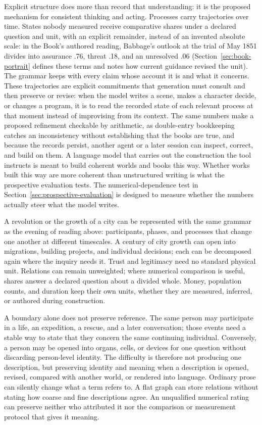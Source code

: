 \documentclass[11pt,a4paper]{article}
\begin{document}
Explicit structure does more than record that understanding: it is the proposed
mechanism for consistent thinking and acting. Processes carry trajectories over
time. States nobody measured receive comparative shares under a declared
question and unit, with an explicit remainder, instead of an invented absolute
scale: in the Book's authored reading, Babbage's outlook at the trial of May 1851
divides into assurance .76, threat .18, and an unresolved .06
(Section~\ref{sec:book-portrait} defines these terms and notes how current
guidance revised the unit). The grammar keeps with every claim whose account it
is and what it concerns. These
trajectories are explicit commitments that generation must consult and then
preserve or revise: when the model writes a scene, makes a character decide, or
changes a program, it is to read the recorded state of each relevant process at
that moment instead of improvising from its context. The same numbers make a
proposed refinement checkable by arithmetic, as double-entry bookkeeping catches
an inconsistency without establishing that the books are true, and because the
records persist, another agent or a later session can inspect, correct, and build
on them. A language model that carries out the construction the tool instructs is
meant to build coherent worlds and books this way. Whether works built
this way are more coherent than unstructured writing is what the prospective
evaluation tests. The numerical-dependence test in Section~\ref{sec:prospective-evaluation} is
designed to measure whether the numbers actually steer what the model writes.

A revolution or the growth of a city can be represented with the same grammar
as the evening of reading above: participants, phases, and processes that change one another
at different timescales. A century of city growth can open into migrations,
building projects, and individual decisions; each can be decomposed again where
the inquiry needs it. Trust and legitimacy need no standard physical unit.
Relations can remain unweighted; where numerical comparison is useful, shares
answer a declared question about a divided whole. Money, population counts, and
duration keep their own units, whether they are measured, inferred, or authored
during construction.

A boundary alone does not preserve reference. The same person may participate
in a life, an expedition, a rescue, and a later conversation; those events need
a stable way to state that they concern the same continuing individual.
Conversely, a person may be opened into organs, cells, or devices for one
question without discarding person-level identity. The difficulty is therefore
not producing one description, but preserving identity and meaning when a
description is opened, revised, compared with another world, or rendered into
language. Ordinary prose can silently change what a term refers to. A flat
graph can store relations without stating how coarse and fine descriptions
agree. An unqualified numerical rating can preserve neither who attributed it
nor the comparison or measurement protocol that gives it meaning.
\end{document}
